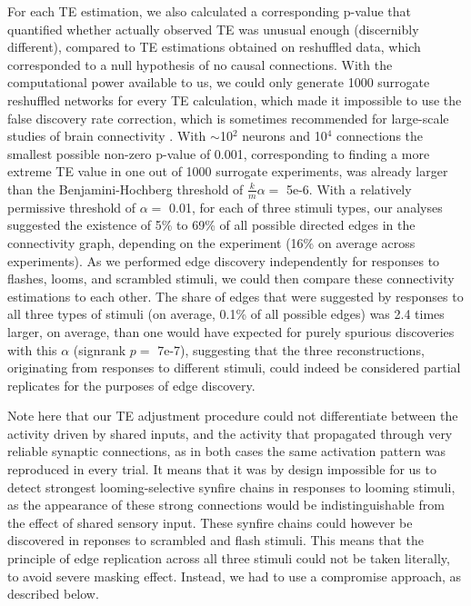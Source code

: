 \documentclass{article}
\begin{document}
For each TE estimation, we also calculated a corresponding p-value that quantified whether actually observed TE was unusual enough (discernibly different), compared to TE estimations obtained on reshuffled data, which corresponded to a null hypothesis of no causal connections. With the computational power available to us, we could only generate 1000 surrogate reshuffled networks for every TE calculation, which made it impossible to use the false discovery rate correction, which is sometimes recommended for large-scale studies of brain connectivity \citep{lindner2011trentool, vicente2011te}. With $\sim$10$^2$ neurons and 10$^4$ connections the smallest possible non-zero p-value of 0.001, corresponding to finding a more extreme TE value in one out of 1000 surrogate experiments, was already larger than the Benjamini-Hochberg threshold of $\frac{k}{m}\alpha=$ 5e-6. With a relatively permissive threshold of $\alpha=$ 0.01, for each of three stimuli types, our analyses suggested the existence of 5\% to 69\% of all possible directed edges in the connectivity graph, depending on the experiment (16\% on average across experiments). As we performed edge discovery independently for responses to flashes, looms, and scrambled stimuli, we could then compare these connectivity estimations to each other. The share of edges that were suggested by responses to all three types of stimuli (on average, 0.1\% of all possible edges) was 2.4 times larger, on average, than one would have expected for purely spurious discoveries with this $\alpha$ (signrank $p=$ 7e-7), suggesting that the three reconstructions, originating from responses to different stimuli, could indeed be considered partial replicates for the purposes of edge discovery. 

Note here that our TE adjustment procedure could not differentiate between the activity driven by shared inputs, and the activity that propagated through very reliable synaptic connections, as in both cases the same activation pattern was reproduced in every trial. It means that it was by design impossible for us to detect strongest looming-selective synfire chains in responses to looming stimuli, as the appearance of these strong connections would be indistinguishable from the effect of shared sensory input. These synfire chains could however be discovered in reponses to scrambled and flash stimuli. This means that the principle of edge replication across all three stimuli could not be taken literally, to avoid severe masking effect. Instead, we had to use a compromise approach, as described below.
\end{document}
